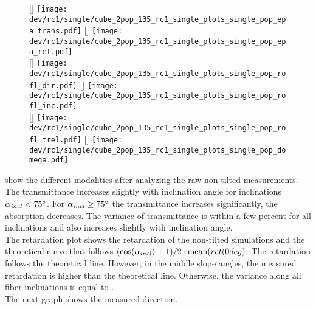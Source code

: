 \begin{figure}[!p]
\centering
\setlength{\width}{0.45\textwidth}
[\width]{
\texttt{[image: dev/rc1/single/cube\_2pop\_135\_rc1\_single\_plots\_single\_pop\_epa\_trans.pdf]}}\hfill
{}[\width]{
\texttt{[image: dev/rc1/single/cube\_2pop\_135\_rc1\_single\_plots\_single\_pop\_epa\_ret.pdf]}}
\\[2em]
[\width]{
\texttt{[image: dev/rc1/single/cube\_2pop\_135\_rc1\_single\_plots\_single\_pop\_rofl\_dir.pdf]}}\hfill
{}[\width]{
\texttt{[image: dev/rc1/single/cube\_2pop\_135\_rc1\_single\_plots\_single\_pop\_rofl\_inc.pdf]}}
\\[2em]
[\width]{
\texttt{[image: dev/rc1/single/cube\_2pop\_135\_rc1\_single\_plots\_single\_pop\_rofl\_trel.pdf]}}\hfill
{}[\width]{
\texttt{[image: dev/rc1/single/cube\_2pop\_135\_rc1\_single\_plots\_single\_pop\_domega.pdf]}}
\caption[]{ }
\label{fig:single_fiber_pop_rofl}
\end{figure}
% 
 show the different modalities after analyzing the raw non-tilted measurements.
The transmittance increases slightly with inclination angle for inclinations $\textnormal{$\alpha_{\mathit{incl}}$}<\SI{75}{\degree}$.
For $\textnormal{$\alpha_{\mathit{incl}}$} \ge \SI{75}{\degree}$ the transmittance increases significantly, \ie{} the absorption decreases.
The variance of transmittance is within a few percent for all inclinations and also increases slightly with inclination angle.
\\
% 
The retardation plot shows the retardation of the non-tilted simulations and the theoretical curve that follows $(\cos(\textnormal{$\alpha_{\mathit{incl}}$}) + 1) / 2 \cdot \mathrm{mean}(ret(0 deg)$.
The retardation follows the theoretical line.
However, in the middle slope angles, the measured retardation is higher than the theoretical line.
Otherwise, the variance along all fiber inclinations is equal to \modelInc{}.
\\
% 
The next graph shows the measured direction.
